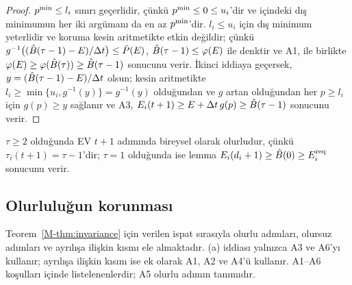 \begin{proof}
$p^{\min}\le l_i$ sınırı geçerlidir, çünkü $p^{\min}\le0\le u_i$'dir ve  içindeki dış minimumun her iki argümanı da en az $p^{\min}$'dir.
$l_i\le u_i$ için dış minimum yeterlidir ve koruma kesin aritmetikte etkin değildir; çünkü $g^{-1}\big((\hat B(\tau-1)-E)/\Delta t\big)\le\bar P(E)$, $\hat B(\tau-1)\le\varphi(E)$ ile denktir ve A1,  ile birlikte $\varphi(E)\ge\varphi(\hat B(\tau))\ge\hat B(\tau-1)$ sonucunu verir.
İkinci iddiaya geçersek, $y=(\hat B(\tau-1)-E)/\Delta t$ olsun; kesin aritmetikte $l_i\ge\min\{u_i,g^{-1}(y)\}=g^{-1}(y)$ olduğundan ve $g$ artan olduğundan her $p\ge l_i$ için $g(p)\ge y$ sağlanır ve A3, $E_i(t+1)\ge E+\Delta t\,g(p)\ge\hat B(\tau-1)$ sonucunu verir.
\end{proof}

$\tau\ge2$ olduğunda EV $t+1$ adımında bireysel olarak olurludur, çünkü $\tau_i(t+1)=\tau-1$'dir; $\tau=1$ olduğunda ise lemma $E_i(d_i+1)\ge\hat B(0)\ge E^{\mathrm{req}}_i$ sonucunu verir.

\subsection{Olurluluğun korunması}\label{app:theorem}

Teorem~\ref{M-thm:invariance} için verilen ispat sırasıyla olurlu adımları, olursuz adımları ve ayrılışa ilişkin kısmı ele almaktadır.
(a) iddiası yalnızca A3 ve A6'yı kullanır; ayrılışa ilişkin kısım ise ek olarak A1, A2 ve A4'ü kullanır.
A1--A6 koşulları  içinde listelenenlerdir; A5 olurlu adımın tanımıdır.

